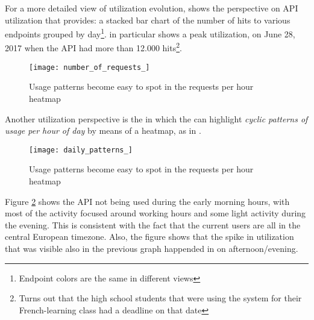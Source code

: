 

  For a more detailed view of utilization evolution,  shows the  perspective on API utilization that \tool provides: a stacked bar chart of the number of hits to various endpoints grouped by day\footnote{Endpoint colors are the same in different views}.  in particular shows a peak utilization, on June 28, 2017 when the API had more than 12.000 hits\footnote{Turns out that the high school students that were using the system for their French-learning class had a deadline on that date}. 

    \begin{figure}[!ht]
    \centering
    \texttt{[image: number\_of\_requests\_]}
    \caption{Usage patterns become easy to spot in the requests per hour heatmap}
    \label{fig:aeu}
    \end{figure}


\niceseparator


  Another utilization perspective is the  in which  the \tool can highlight {\em cyclic patterns of usage per hour of day} by means of a heatmap, as in . 


    \begin{figure}
      \centering
      \texttt{[image: daily\_patterns\_]}
      \caption{Usage patterns become easy to spot in the requests per hour heatmap}
      \label{fig:dp}
    \end{figure}


  Figure \ref{fig:dp} shows the API not being used during the early morning hours, with most of the activity focused around working hours and some light activity during the evening. This is consistent with the fact that the current users are all in the central European timezone. Also, the figure shows that the spike in utilization that was visible also in the previous graph happended in on afternoon/evening.






